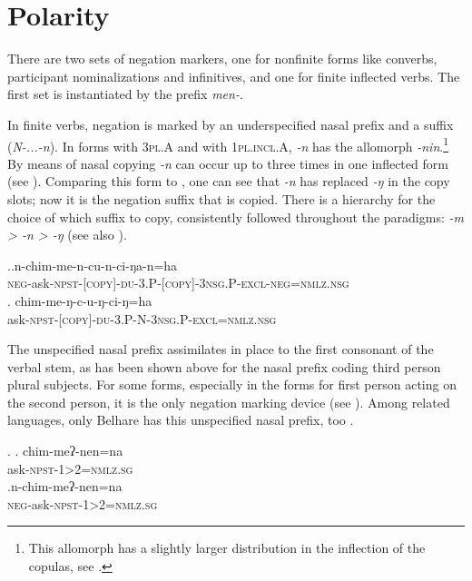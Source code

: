  


\section{Polarity}\label{neg}

There are two sets of negation markers, one for nonfinite forms like converbs, participant nominalizations and infinitives, and one for finite inflected verbs. The first set is instantiated by the prefix \emph{men-}. 

In finite verbs, negation is marked by an underspecified nasal prefix and a suffix (\emph{N-...-n}). In forms with {\scshape 3pl.A} and with {\scshape 1pl.incl.A}, \emph{-n} has the allomorph \emph{-nin}.\footnote{This allomorph has a slightly larger distribution in the inflection of the copulas, see  .} By means of  nasal copying \emph{-n} can occur up to three times in one inflected form (see \Next[a]). Comparing this form to \Next[b], one can see that \emph{-n} has replaced \emph{-ŋ} in the copy slots; now it is the negation suffix that is copied. There is a hierarchy for the choice of which suffix to copy, consistently followed throughout the paradigms: \emph{-m > -n > -ŋ} (see also ). 

\ex.\ag.n-chim-me-n-cu-n-ci-ŋa-n=ha\\
{\scshape neg-}ask{\scshape -npst-[copy]-du-3.P-[copy]-3nsg.P-excl-neg=nmlz.nsg}\\
	\bg. chim-me-ŋ-c-u-ŋ-ci-ŋ=ha\\
	ask{\scshape -npst-[copy]-du-3.P-N-3nsg.P-excl=nmlz.nsg}\\
	
	
The unspecified nasal prefix assimilates in place to the first consonant of the verbal stem, as has been shown above for the nasal prefix coding third person plural subjects. For some forms, especially in the forms for first person acting on the second person, it is the only negation marking device (see \Next). Among related languages, only Belhare has this unspecified nasal prefix, too \citep[554]{Bickel2003Belhare}. 

\ex. \ag.  chim-meʔ-nen=na\\
	 ask{\scshape -npst-1>2=nmlz.sg}\\
		\bg.n-chim-meʔ-nen=na\\
	{\scshape neg-}ask{\scshape -npst-1>2=nmlz.sg}\\

